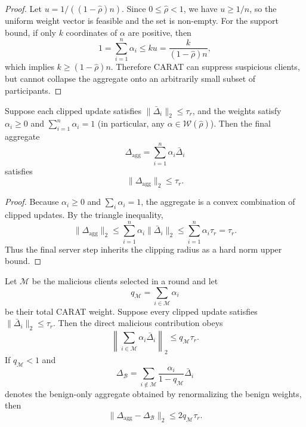 \begin{proof}
Let $u = 1/((1-\hat{\rho})n)$. Since $0\le\hat{\rho}<1$, we have $u \ge 1/n$, so the uniform weight vector is feasible and the set is non-empty. For the support bound, if only $k$ coordinates of $\alpha$ are positive, then
\[
1=\sum_{i=1}^n \alpha_i \le k u = \frac{k}{(1-\hat{\rho})n},
\]
which implies $k \ge (1-\hat{\rho})n$. Therefore CARAT can suppress suspicious clients, but cannot collapse the aggregate onto an arbitrarily small subset of participants.
\end{proof}

\begin{proposition}
\label{prop:aggregate-bound}
Suppose each clipped update satisfies $\|\bar{\Delta}_i\|_2 \le \tau_r$, and the weights satisfy $\alpha_i\ge0$ and $\sum_{i=1}^n\alpha_i=1$ (in particular, any $\alpha \in \mathcal{W}(\hat{\rho})$). Then the final aggregate
\[
\Delta_{\mathrm{agg}}=\sum_{i=1}^n \alpha_i \bar{\Delta}_i
\]
satisfies
\[
\|\Delta_{\mathrm{agg}}\|_2 \le \tau_r.
\]
\end{proposition}

\begin{proof}
Because $\alpha_i \ge 0$ and $\sum_i \alpha_i=1$, the aggregate is a convex combination of clipped updates. By the triangle inequality,
\[
\|\Delta_{\mathrm{agg}}\|_2
\le
\sum_{i=1}^n \alpha_i \|\bar{\Delta}_i\|_2
\le
\sum_{i=1}^n \alpha_i \tau_r
=
\tau_r.
\]
Thus the final server step inherits the clipping radius as a hard norm upper bound.
\end{proof}

\begin{proposition}
\label{prop:malicious-mass-bound}
Let $\mathcal{M}$ be the malicious clients selected in a round and let
\[
q_{\mathcal{M}}=\sum_{i\in\mathcal{M}}\alpha_i
\]
be their total CARAT weight. Suppose every clipped update satisfies $\|\bar{\Delta}_i\|_2\le\tau_r$. Then the direct malicious contribution obeys
\[
\left\|\sum_{i\in\mathcal{M}}\alpha_i\bar{\Delta}_i\right\|_2
\le q_{\mathcal{M}}\tau_r.
\]
If $q_{\mathcal{M}}<1$ and
\[
\Delta_{\mathcal{B}}=
\sum_{i\notin\mathcal{M}}\frac{\alpha_i}{1-q_{\mathcal{M}}}\bar{\Delta}_i
\]
denotes the benign-only aggregate obtained by renormalizing the benign weights, then
\[
\|\Delta_{\mathrm{agg}}-\Delta_{\mathcal{B}}\|_2
\le 2q_{\mathcal{M}}\tau_r.
\]
\end{proposition}

